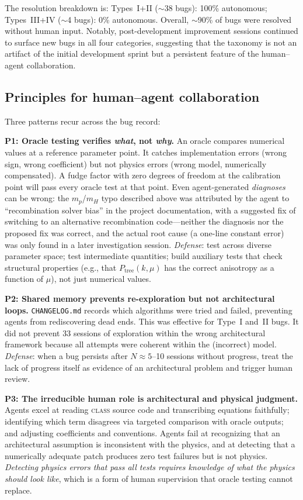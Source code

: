 \documentclass{article}
\newcommand{\class}{\textsc{class}\xspace}
\begin{document}
The resolution breakdown is: Types~I+II ($\sim$38 bugs): 100\% autonomous; Types~III+IV ($\sim$4 bugs): 0\% autonomous.
Overall, $\sim$90\% of bugs were resolved without human input.
Notably, post-development improvement sessions continued to surface new bugs in all four categories, suggesting that the taxonomy is not an artifact of the initial development sprint but a persistent feature of the human--agent collaboration.

\subsection{Principles for human--agent collaboration}

Three patterns recur across the bug record:

\textbf{P1: Oracle testing verifies \emph{what}, not \emph{why}.}
An oracle compares numerical values at a reference parameter point.
It catches implementation errors (wrong sign, wrong coefficient) but not physics errors (wrong model, numerically compensated).
A fudge factor with zero degrees of freedom at the calibration point will pass every oracle test at that point.
Even agent-generated \emph{diagnoses} can be wrong: the $m_p$/$m_H$ typo described above was attributed by the agent to ``recombination solver bias'' in the project documentation, with a suggested fix of switching to an alternative recombination code---neither the diagnosis nor the proposed fix was correct, and the actual root cause (a one-line constant error) was only found in a later investigation session.
\emph{Defense}: test across diverse parameter space; test intermediate quantities; build auxiliary tests that check structural properties (e.g., that $P_\mathrm{tree}(k,\mu)$ has the correct anisotropy as a function of $\mu$), not just numerical values.

\textbf{P2: Shared memory prevents re-exploration but not architectural loops.}
\texttt{CHANGELOG.md} records which algorithms were tried and failed, preventing agents from rediscovering dead ends.
This was effective for Type~I and~II bugs.
It did not prevent 33 sessions of exploration within the wrong architectural framework because all attempts were coherent within the (incorrect) model.
\emph{Defense}: when a bug persists after $N \approx 5$--10 sessions without progress, treat the lack of progress itself as evidence of an architectural problem and trigger human review.

\textbf{P3: The irreducible human role is architectural and physical judgment.}
Agents excel at reading \class source code and transcribing equations faithfully; identifying which term disagrees via targeted comparison with oracle outputs; and adjusting coefficients and conventions.
Agents fail at recognizing that an architectural assumption is inconsistent with the physics, and at detecting that a numerically adequate patch produces zero test failures but is not physics.
\emph{Detecting physics errors that pass all tests requires knowledge of what the physics should look like}, which is a form of human supervision that oracle testing cannot replace.
\end{document}
